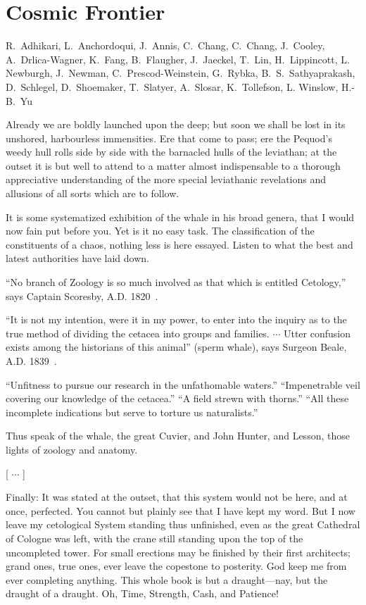 
\setcounter{chapter}{4} 

\chapter{Cosmic Frontier}

   {R.~Adhikari, L.~Anchordoqui, J.~Annis, C.~Chang, C.~Chang, J.~Cooley,   A.~Drlica-Wagner, K.~Fang, B.~Flaugher,  J.~Jaeckel, 
  T.~Lin, H.~Lippincott, L. Newburgh,  J.~Newman, C.~Prescod-Weinstein,   G.~Rybka, 
B.~S.~Sathyaprakash,
D.~Schlegel, D.~Shoemaker, T.~Slatyer, A.~Slosar, K.~Tollefson, L. Winslow, H.-B.~Yu }


Already we are boldly launched upon the deep; but soon we shall be lost in its unshored, harbourless immensities. Ere that come to pass; ere the Pequod’s weedy hull rolls side by side with the barnacled hulls of the leviathan; at the outset it is but well to attend to a matter almost indispensable to a thorough appreciative understanding of the more special leviathanic revelations and allusions of all sorts which are to follow.

It is some systematized exhibition of the whale in his broad genera, that I would now fain put before you. Yet is it no easy task. The classification of the constituents of a chaos, nothing less is here essayed. Listen to what the best and latest authorities have laid down.

``No branch of Zoology is so much involved as that which is entitled Cetology,'' says Captain Scoresby, A.D. 1820~\cite{C-Scoresby}.

``It is not my intention, were it in my power, to enter into the inquiry as to the true method of dividing the cetacea into groups and families. $\cdots$ Utter confusion exists among the historians of this animal'' (sperm whale), says Surgeon Beale, A.D. 1839~\cite{C-Beale}.

``Unfitness to pursue our research in the unfathomable waters.'' ``Impenetrable veil covering our knowledge of the cetacea.''  ``A field strewn with thorns.'' ``All these incomplete indications but serve to torture us naturalists.''

Thus speak of the whale, the great Cuvier, and John Hunter, and Lesson, those lights of zoology and anatomy.

[ $\cdots$ ]

Finally: It was stated at the outset, that this system would not be here, and at once, perfected. You cannot but plainly see that I have kept my word. But I now leave my cetological System standing thus unfinished, even as the great Cathedral of Cologne was left, with the crane still standing upon the top of the uncompleted tower. For small erections may be finished by their first architects; grand ones, true ones, ever leave the copestone to posterity. God keep me from ever completing anything. This whole book is but a draught---nay, but the draught of a draught. Oh, Time, Strength, Cash, and Patience!


